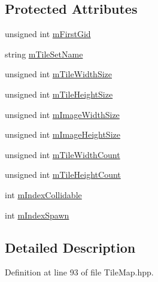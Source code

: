 \subsection*{Protected Attributes}
\begin{DoxyCompactItemize}
\item 
unsigned int \hyperlink{class_tile_map_set_aa30770be0b41115d5267c288c980d967}{m\-First\-Gid}
\item 
string \hyperlink{class_tile_map_set_a355b36e8f407752bd128b2a7d8babbba}{m\-Tile\-Set\-Name}
\item 
unsigned int \hyperlink{class_tile_map_set_ad1dee478b0dd00ff72a6635fd068b8cb}{m\-Tile\-Width\-Size}
\item 
unsigned int \hyperlink{class_tile_map_set_aa4620605087a8738afdfa4ef3e5fad99}{m\-Tile\-Height\-Size}
\item 
unsigned int \hyperlink{class_tile_map_set_ad70411018be2b8ce950e00b70020c703}{m\-Image\-Width\-Size}
\item 
unsigned int \hyperlink{class_tile_map_set_abf6e23ffe5ce47b8d25bd7e24e8bf386}{m\-Image\-Height\-Size}
\item 
unsigned int \hyperlink{class_tile_map_set_a53e0c59bfbd6285e0b0ca8f79a4af02c}{m\-Tile\-Width\-Count}
\item 
unsigned int \hyperlink{class_tile_map_set_a6bd7b84fef3fdd9fb1312e256ec55b4a}{m\-Tile\-Height\-Count}
\item 
int \hyperlink{class_tile_map_set_a02448f7bf82af58a2b660b7c4811479d}{m\-Index\-Collidable}
\item 
int \hyperlink{class_tile_map_set_abdcf3d4f5e9d82aeba620a7358068a42}{m\-Index\-Spawn}
\end{DoxyCompactItemize}


\subsection{Detailed Description}


Definition at line 93 of file Tile\-Map.\-hpp.



